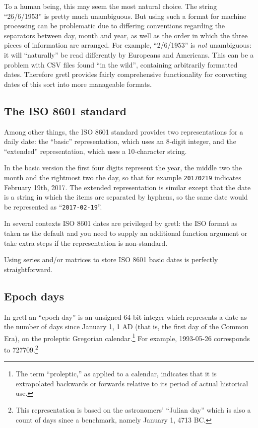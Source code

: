 To a human being, this may seem the most natural choice.  The string
``26/6/1953'' is pretty much unambiguous. But using such a format for
machine processing can be problematic due to differing conventions
regarding the separators between day, month and year, as well as the
order in which the three pieces of information are arranged.  For
example, ``2/6/1953'' is \textit{not} unambiguous: it will
``naturally'' be read differently by Europeans and Americans. This can
be a problem with CSV files found ``in the wild'', containing
arbitrarily formatted dates. Therefore gretl provides fairly
comprehensive functionality for converting dates of this sort into
more manageable formats.

\subsection{The ISO 8601 standard}
\label{sec:cal-ISO8601}

Among other things, the ISO 8601 standard provides two representations
for a daily date: the ``basic'' representation, which uses an 8-digit
integer, and the ``extended'' representation, which uses a
10-character string.

In the basic version the first four digits represent the year, the
middle two the month and the rightmost two the day, so that for
example \texttt{20170219} indicates February 19th, 2017. The extended
representation is similar except that the date is a string in which
the items are separated by hyphens, so the same date would be
represented as ``\texttt{2017-02-19}''.

In several contexts ISO 8601 dates are privileged by gretl: the ISO
format as taken as the default and you need to supply an additional
function argument or take extra steps if the representation is
non-standard.

Using series and/or matrices to store ISO 8601 basic dates is
perfectly straightforward.

\subsection{Epoch days}
\label{sec:cal-epochday}

In gretl an ``epoch day'' is an unsigned 64-bit integer which
represents a date as the number of days since January 1, 1 AD (that
is, the first day of the Common Era), on the proleptic Gregorian
calendar.\footnote{The term ``proleptic,'' as applied to a calendar,
  indicates that it is extrapolated backwards or forwards relative to
  its period of actual historical use.} For example, 1993-05-26
corresponds to 727709.\footnote{This representation is based on the
  astronomers' ``Julian day'' which is also a count of days since a
  benchmark, namely January 1, 4713 BC.}

